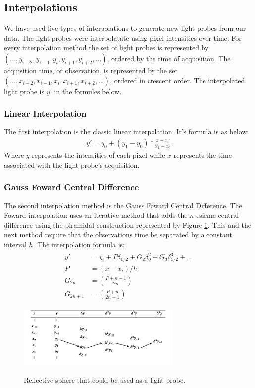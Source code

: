 \documentclass[conference]{acmsiggraph}
\begin{document}
\subsection{Interpolations}
	We have used five types of  interpolations to generate new light probes from our data. The light probes were interpolatate using pixel intensities over time.
For every interpolation method the set of light probes is represented by $(\dots,y_{i-2},y_{i-1},y_i,y_{i+1},y_{i+2},\dots)$, ordered by the time of acquisition.
The acquisition time, or observation, is represented by the set $(\dots,x_{i-2},x_{i-1},x_i,x_{i+1},x_{i+2},\dots)$, ordered in crescent order. The interpolated
light probe is $y'$ in the formules below.
\subsubsection{Linear Interpolation}
	The first interpolation is the classic linear interpolation. It's formula is as below: 
\begin{align}
	y' = y_0 + (y_1-y_0)*\frac{x-x_0}{x_1-x_0}
\end{align}
Where $y$ represents the intensities of each pixel while $x$ represents the time associated with the light probe's acquisition.

\subsubsection{Gauss Foward Central Difference}
	The second interpolation method is the Gauss Foward Central Difference. The Foward interpolation uses an iterative method that adds the $n$-esieme central 
difference\cite{abramowitz1972handbook} using the piramidal construction represented by Figure \ref{fig:fowardcentral}. This and the next method require
that the observations time be separated by a constant interval $h$. The interpolation formula is:
\begin{align}
\begin{split}
	y' &= 	y_i + P \delta_{1/2} + G_2 \delta_0^2 + G_3 \delta_{1/2}^3 + \dots\\
	P &= (x-x_i)/h \\
	G_{2n} &= \binom{P+n-1}{2n} \\
	G_{2n+1} &= \binom{P+n}{2n+1}
\end{split}
\end{align}

\begin{figure}[H]
	\caption{Reflective sphere that could be used as a light probe.}
	\centering
	\includegraphics[width=08cm]{images/forward.png}
	\label{fig:fowardcentral}
\end{figure}
\end{document}
